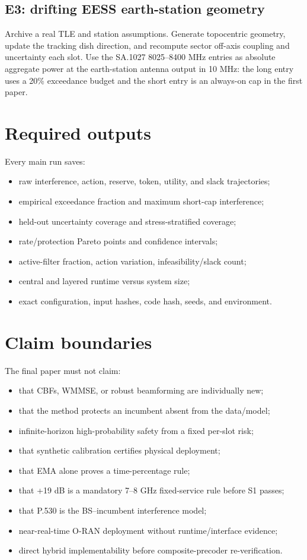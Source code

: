 \documentclass[11pt]{article}
\begin{document}
\subsection{E3: drifting EESS earth-station geometry}

Archive a real TLE and station assumptions. Generate topocentric geometry, update the tracking dish direction, and recompute sector off-axis coupling and uncertainty each slot. Use the SA.1027 8025--8400 MHz entries as absolute aggregate power at the earth-station antenna output in 10 MHz: the long entry uses a 20\% exceedance budget and the short entry is an always-on cap in the first paper.

\section{Required outputs}

Every main run saves:

\begin{itemize}
\item raw interference, action, reserve, token, utility, and slack trajectories;
\item empirical exceedance fraction and maximum short-cap interference;
\item held-out uncertainty coverage and stress-stratified coverage;
\item rate/protection Pareto points and confidence intervals;
\item active-filter fraction, action variation, infeasibility/slack count;
\item central and layered runtime versus system size;
\item exact configuration, input hashes, code hash, seeds, and environment.
\end{itemize}

\section{Claim boundaries}

The final paper must not claim:

\begin{itemize}
\item that CBFs, WMMSE, or robust beamforming are individually new;
\item that the method protects an incumbent absent from the data/model;
\item infinite-horizon high-probability safety from a fixed per-slot risk;
\item that synthetic calibration certifies physical deployment;
\item that EMA alone proves a time-percentage rule;
\item that +19 dB is a mandatory 7--8 GHz fixed-service rule before S1 passes;
\item that P.530 is the BS--incumbent interference model;
\item near-real-time O-RAN deployment without runtime/interface evidence;
\item direct hybrid implementability before composite-precoder re-verification.
\end{itemize}
\end{document}
